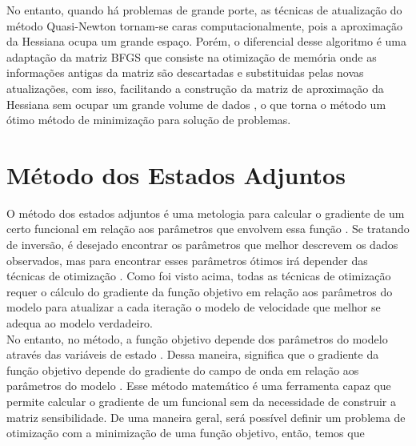  No entanto, quando há problemas de grande porte, as técnicas de atualização do método Quasi-Newton tornam-se caras computacionalmente, pois a aproximação da Hessiana ocupa um grande espaço. Porém, o diferencial desse algoritmo é uma adaptação da matriz BFGS que consiste na otimização de memória onde as informações antigas da matriz são descartadas e substituidas pelas novas atualizações, com isso, facilitando a construção da matriz de aproximação da Hessiana sem ocupar um grande volume de dados \citep{morales_remark_2011,zhu_algorithm_1997}, o que torna o método um ótimo método de minimização para solução de problemas. \\
 
 








\newpage
\section{Método dos Estados Adjuntos}
O método dos estados adjuntos é uma metologia para calcular o gradiente de um certo funcional em relação aos parâmetros que envolvem essa função \citep{fichtner_full_2011,virieux_overview_2009}. Se tratando de inversão, é desejado encontrar os parâmetros que melhor descrevem os dados observados, mas para encontrar esses parâmetros ótimos irá depender das técnicas de otimização \citep{nocedal_2006}. Como foi visto acima, todas as técnicas de otimização requer o cálculo do gradiente da função objetivo em relação aos parâmetros do modelo para atualizar a cada iteração o modelo de velocidade que melhor se adequa ao modelo verdadeiro. \\

 No entanto, no método, a função objetivo depende dos parâmetros do modelo através das variáveis de estado \citep{plessix_2006}. Dessa maneira, significa que o gradiente da função objetivo depende do gradiente do campo de onda em relação aos parâmetros do modelo \citep{fichtner_2011}.  Esse método matemático é uma ferramenta capaz que permite calcular o gradiente de um funcional sem da necessidade de construir a matriz sensibilidade. De uma maneira geral, será possível definir um problema de otimização com a minimização de uma função objetivo, então, temos que 

